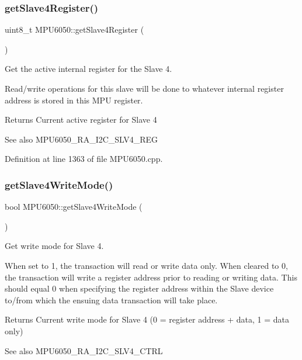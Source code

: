 \subsubsection{\texorpdfstring{getSlave4Register()}{getSlave4Register()}}
{\footnotesize\ttfamily uint8\+\_\+t M\+P\+U6050\+::get\+Slave4\+Register (\begin{DoxyParamCaption}{ }\end{DoxyParamCaption})}



Get the active internal register for the Slave 4. 

Read/write operations for this slave will be done to whatever internal register address is stored in this M\+PU register.

\begin{DoxyReturn}{Returns}
Current active register for Slave 4 
\end{DoxyReturn}
\begin{DoxySeeAlso}{See also}
M\+P\+U6050\+\_\+\+R\+A\+\_\+\+I2\+C\+\_\+\+S\+L\+V4\+\_\+\+R\+EG 
\end{DoxySeeAlso}


Definition at line 1363 of file M\+P\+U6050.\+cpp.

\mbox{\label{classMPU6050_a8d5a5e73907c78960154b92656127372}} 
\subsubsection{\texorpdfstring{getSlave4WriteMode()}{getSlave4WriteMode()}}
{\footnotesize\ttfamily bool M\+P\+U6050\+::get\+Slave4\+Write\+Mode (\begin{DoxyParamCaption}{ }\end{DoxyParamCaption})}



Get write mode for Slave 4. 

When set to 1, the transaction will read or write data only. When cleared to 0, the transaction will write a register address prior to reading or writing data. This should equal 0 when specifying the register address within the Slave device to/from which the ensuing data transaction will take place.

\begin{DoxyReturn}{Returns}
Current write mode for Slave 4 (0 = register address + data, 1 = data only) 
\end{DoxyReturn}
\begin{DoxySeeAlso}{See also}
M\+P\+U6050\+\_\+\+R\+A\+\_\+\+I2\+C\+\_\+\+S\+L\+V4\+\_\+\+C\+T\+RL 
\end{DoxySeeAlso}


